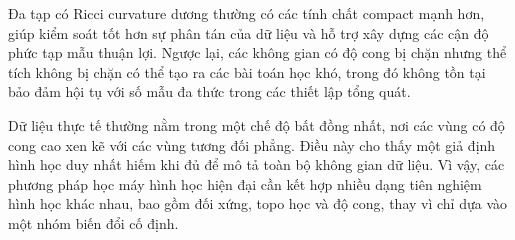 Đa tạp có Ricci curvature dương thường có các tính chất compact mạnh hơn, giúp kiểm soát tốt hơn sự phân tán của dữ liệu và hỗ trợ xây dựng các cận độ phức tạp mẫu thuận lợi. Ngược lại, các không gian có độ cong bị chặn nhưng thể tích không bị chặn có thể tạo ra các bài toán học khó, trong đó không tồn tại bảo đảm hội tụ với số mẫu đa thức trong các thiết lập tổng quát.

Dữ liệu thực tế thường nằm trong một chế độ bất đồng nhất, nơi các vùng có độ cong cao xen kẽ với các vùng tương đối phẳng. Điều này cho thấy một giả định hình học duy nhất hiếm khi đủ để mô tả toàn bộ không gian dữ liệu. Vì vậy, các phương pháp học máy hình học hiện đại cần kết hợp nhiều dạng tiên nghiệm hình học khác nhau, bao gồm đối xứng, topo học và độ cong, thay vì chỉ dựa vào một nhóm biến đổi cố định.


\clearpage
